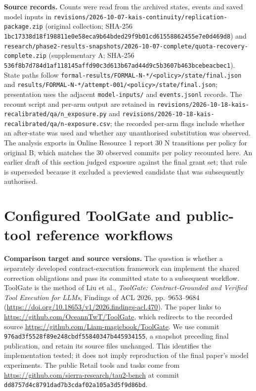 \documentclass[10pt,a4paper]{article}
\begin{document}
\textbf{Source records.} Counts were read from the archived states, events and saved model inputs in \nolinkurl{revisions/2026-10-07-kais-continuity/replication-package.zip} (original collection; SHA-256 \nolinkurl{1bc17338d18f198811e0e58eca9b64bded29f9b01cd61558862455e7e0d469d8}) and \nolinkurl{research/phase2-results-snapshots/2026-10-07-complete/quota-recovery-complete.zip} (supplementary A; SHA-256 \nolinkurl{536f8b7d784d1af118145affd90c3d613b67ad44d9c5b3607b463bcebeacbec1}). State paths follow \nolinkurl{formal-results/FORMAL-N-*/<policy>/state/final.json} and \nolinkurl{results/FORMAL-N-*/attempt-001/<policy>/state/final.json}; presentation uses the adjacent \nolinkurl{model-inputs/} and \nolinkurl{events.jsonl} records. The recount script and per-arm output are retained in \nolinkurl{revisions/2026-10-18-kais-recalibrated/qa/n_exposure.py} and \nolinkurl{revisions/2026-10-18-kais-recalibrated/qa/n-exposure.csv}; the recorded per-arm flags include whether an after-state was used and whether any unauthorised substitution was observed. The analysis exports in Online Resource 1 report 30 N transitions per policy for original B, which matches the 30 observed commits per policy recounted here. An earlier draft of this section judged exposure against the final grant set; that rule is superseded because it excluded a previewed candidate that was subsequently authorised.

\section{Configured ToolGate and public-tool reference workflows}
\label{sec:a8-toolgate}
\textbf{Comparison target and source versions.}
The question is whether a separately developed contract-execution framework can implement the shared correction obligations and pass its committed state to a subsequent workflow. ToolGate is the method of Liu et al., \emph{ToolGate: Contract-Grounded and Verified Tool Execution for LLMs}, Findings of ACL 2026, pp.~9653--9684 (\url{https://doi.org/10.18653/v1/2026.findings-acl.470}). The paper links to \url{https://github.com/OceannTwT/ToolGate}, which redirects to the recorded source \url{https://github.com/Liam-magicbook/ToolGate}. We use commit \nolinkurl{976ad3f5528f89e248cbdf55840347b445934155}, a snapshot preceding final publication, and retain its source files unchanged. This identifies the implementation tested; it does not imply reproduction of the final paper's model experiments. The public Retail tools and tasks come from \url{https://github.com/sierra-research/tau2-bench} at commit \nolinkurl{dd8757d4c8791dad7b3cdaf02a105a3d5f9d86bd}.
\end{document}
